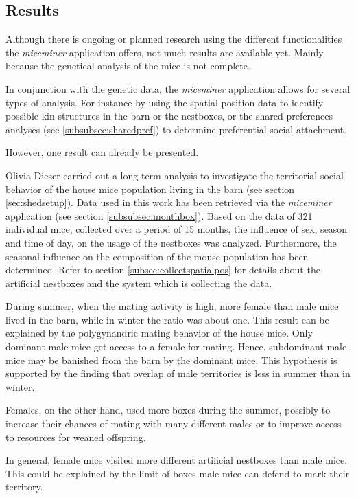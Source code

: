\subsection{Results}
\label{subsec:results}
 
Although there is ongoing or planned research using the different functionalities the \textit{miceminer} application offers, not much results are available yet. Mainly because the genetical analysis of the mice is not complete. 
 
In conjunction with the genetic data, the \textit{miceminer} application allows for several types of analysis. For instance by using the spatial position data to identify possible kin structures in the barn or the nestboxes, or the shared preferences analyses (see \ref{subsubsec:sharedpref}) to determine preferential social attachment. 
 
However, one result can already be presented.
 
Olivia Dieser \citep{dieser:08} carried out a long-term analysis to investigate the territorial social behavior of the house mice population living in the barn (see section \ref{sec:shedsetup}). Data used in this work has been retrieved via the \textit{miceminer} application (see section \ref{subsubsec:monthbox}). Based on the data of 321 individual mice, collected over a period of 15 months, the influence of sex, season and time of day, on the usage of the nestboxes was analyzed. Furthermore, the seasonal influence on the composition of the mouse population has been determined. Refer to section \ref{subsec:collectspatialpos} for details about the artificial nestboxes and the system which is collecting the data.
 
During summer, when the mating activity is high, more female than male mice lived in the barn, while in winter the ratio was about one. This result can be explained by the polygynandric mating behavior of the house mice. Only dominant male mice get access to a female for mating. Hence, subdominant male mice may be banished from the barn by the dominant mice. This hypothesis is supported by the finding that overlap of male territories is less in summer than in winter. 
 
Females, on the other hand, used more boxes during the summer, possibly to increase their chances of mating with many different males or to improve access to resources for weaned offspring.
 
In general, female mice visited more different artificial nestboxes than male mice. This could be explained by the limit of boxes male mice can defend to mark their territory.